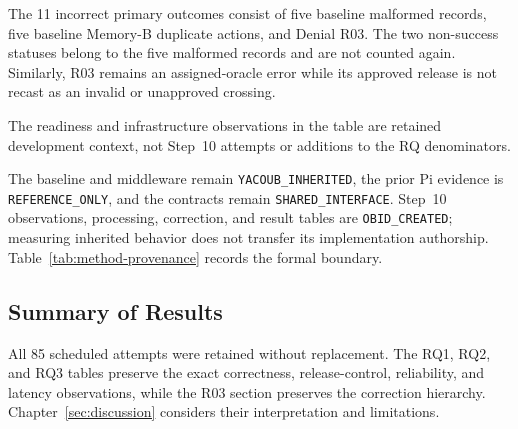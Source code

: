 The 11 incorrect primary outcomes consist of five baseline malformed records,
five baseline Memory-B duplicate actions, and Denial R03. The two non-success
statuses belong to the five malformed records and are not counted again.
Similarly, R03 remains an assigned-oracle error while its approved release is
not recast as an invalid or unapproved crossing.

The readiness and infrastructure observations in the table are retained
development context, not Step~10 attempts or additions to the RQ denominators.

The baseline and middleware remain \texttt{YACOUB\_INHERITED}, the prior Pi
evidence is \texttt{REFERENCE\_ONLY}, and the contracts remain
\texttt{SHARED\_INTERFACE}. Step~10 observations, processing, correction, and
result tables are \texttt{OBID\_CREATED}; measuring inherited behavior does not
transfer its implementation authorship. Table~\ref{tab:method-provenance}
records the formal boundary.

\subsection{Summary of Results}\label{subsec:results-summary}

All 85 scheduled attempts were retained without replacement. The RQ1, RQ2, and
RQ3 tables preserve the exact correctness, release-control, reliability, and
latency observations, while the R03 section preserves the correction hierarchy.
Chapter~\ref{sec:discussion} considers their interpretation and limitations.

